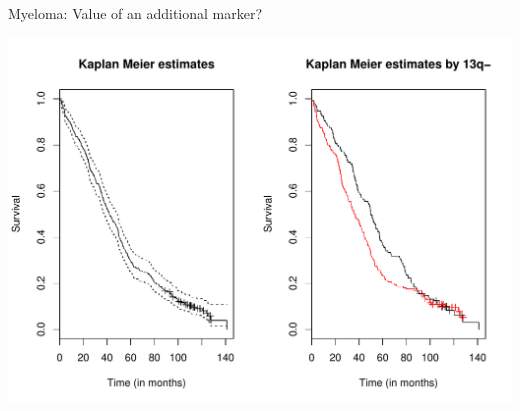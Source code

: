 \documentclass[11pt]{beamer}
\begin{document}
\begin{frame}{Myeloma: Value of an additional marker?}
\begin{center}
\includegraphics[scale=.53]{./figures/myeloma_km.pdf}
\end{center}
\end{frame}

\end{document}
